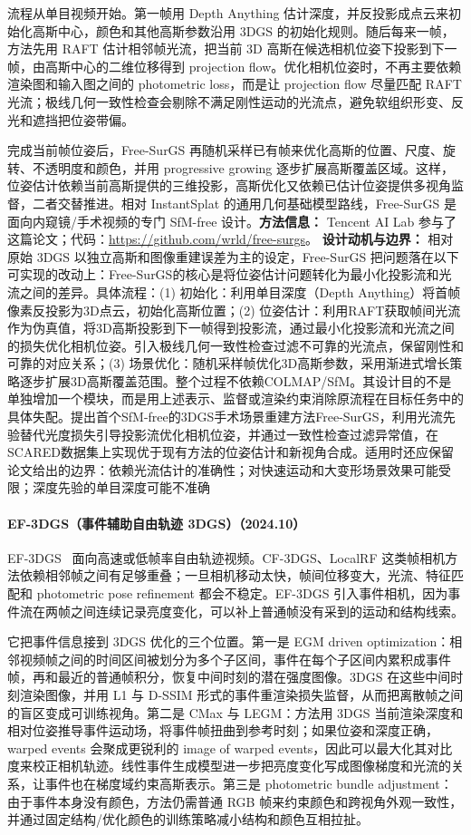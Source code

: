 流程从单目视频开始。第一帧用 Depth Anything 估计深度，并反投影成点云来初始化高斯中心，颜色和其他高斯参数沿用 3DGS 的初始化规则。随后每来一帧，方法先用 RAFT 估计相邻帧光流，把当前 3D 高斯在候选相机位姿下投影到下一帧，由高斯中心的二维位移得到 projection flow。优化相机位姿时，不再主要依赖渲染图和输入图之间的 photometric loss，而是让 projection flow 尽量匹配 RAFT 光流；极线几何一致性检查会剔除不满足刚性运动的光流点，避免软组织形变、反光和遮挡把位姿带偏。

完成当前帧位姿后，Free-SurGS 再随机采样已有帧来优化高斯的位置、尺度、旋转、不透明度和颜色，并用 progressive growing 逐步扩展高斯覆盖区域。这样，位姿估计依赖当前高斯提供的三维投影，高斯优化又依赖已估计位姿提供多视角监督，二者交替推进。相对 InstantSplat 的通用几何基础模型路线，Free-SurGS 是面向内窥镜/手术视频的专门 SfM-free 设计。\textbf{方法信息：} Tencent AI Lab 参与了这篇论文；代码：\url{https://github.com/wrld/free-surgs}。
\textbf{设计动机与边界：} 相对原始 3DGS 以独立高斯和图像重建误差为主的设定，Free-SurGS 把问题落在以下可实现的改动上：Free-SurGS的核心是将位姿估计问题转化为最小化投影流和光流之间的差异。具体流程：(1) 初始化：利用单目深度（Depth Anything）将首帧像素反投影为3D点云，初始化高斯位置；(2) 位姿估计：利用RAFT获取帧间光流作为伪真值，将3D高斯投影到下一帧得到投影流，通过最小化投影流和光流之间的损失优化相机位姿。引入极线几何一致性检查过滤不可靠的光流点，保留刚性和可靠的对应关系；(3) 场景优化：随机采样帧优化3D高斯参数，采用渐进式增长策略逐步扩展3D高斯覆盖范围。整个过程不依赖COLMAP/SfM。其设计目的不是单独增加一个模块，而是用上述表示、监督或渲染约束消除原流程在目标任务中的具体失配。提出首个SfM-free的3DGS手术场景重建方法Free-SurGS，利用光流先验替代光度损失引导投影流优化相机位姿，并通过一致性检查过滤异常值，在SCARED数据集上实现优于现有方法的位姿估计和新视角合成。适用时还应保留论文给出的边界：依赖光流估计的准确性；对快速运动和大变形场景效果可能受限；深度先验的单目深度可能不准确
\paragraph{EF-3DGS（事件辅助自由轨迹 3DGS）（2024.10）}
EF-3DGS~\cite{2410_15392} 面向高速或低帧率自由轨迹视频。CF-3DGS、LocalRF 这类帧相机方法依赖相邻帧之间有足够重叠；一旦相机移动太快，帧间位移变大，光流、特征匹配和 photometric pose refinement 都会不稳定。EF-3DGS 引入事件相机，因为事件流在两帧之间连续记录亮度变化，可以补上普通帧没有采到的运动和结构线索。

它把事件信息接到 3DGS 优化的三个位置。第一是 EGM driven optimization：相邻视频帧之间的时间区间被划分为多个子区间，事件在每个子区间内累积成事件帧，再和最近的普通帧积分，恢复中间时刻的潜在强度图像。3DGS 在这些中间时刻渲染图像，并用 L1 与 D-SSIM 形式的事件重渲染损失监督，从而把离散帧之间的盲区变成可训练视角。第二是 CMax 与 LEGM：方法用 3DGS 当前渲染深度和相对位姿推导事件运动场，将事件帧扭曲到参考时刻；如果位姿和深度正确，warped events 会聚成更锐利的 image of warped events，因此可以最大化其对比度来校正相机轨迹。线性事件生成模型进一步把亮度变化写成图像梯度和光流的关系，让事件也在梯度域约束高斯表示。第三是 photometric bundle adjustment：由于事件本身没有颜色，方法仍需普通 RGB 帧来约束颜色和跨视角外观一致性，并通过固定结构/优化颜色的训练策略减小结构和颜色互相拉扯。

